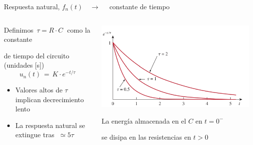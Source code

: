 \documentclass[aspectratio=169, usenames,svgnames,dvipsnames]{beamer}
\begin{document}
\begin{frame}{Respuesta natural, \hspace{3mm}$f_n(t) \quad\rightarrow\quad$ constante de tiempo}
    \begin{columns}
    \begin{column}{0.45\linewidth}

        \vspace{-14mm}
        Definimos \(\, \tau = R\cdot C \;\) como la \alert{constante} 

        \vspace{1mm}
        \alert{de tiempo} del circuito (unidades [s])    
        \[
          \boxed{\; u_n(t) \,=\, K \cdot e^{-t/\tau} \;}
        \]
        
        \begin{itemize}
            \item Valores altos de \(\tau\) implican decrecimiento lento
    
            \vspace{3mm}
            \item La respuesta natural \alert{se extingue} tras \(\; \simeq 5\tau\)
        \end{itemize}
    \end{column}
    \begin{column}{0.55\linewidth}
        \vspace{-1mm}
        \begin{center}
            \includegraphics[height=0.57\textheight]{../figs/constante_tiempo.pdf}
        \end{center}

        \hspace{5mm}La \alert{energía almacenada} en el $C$ en $t=0^-$ 
        
        \hspace{5mm}se \alert{disipa en las resistencias} en $t>0$
    \end{column}
    \end{columns}
\end{frame}
\end{document}
